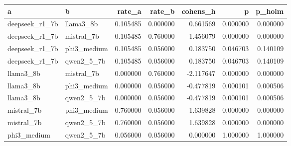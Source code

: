 \begin{tabular}{llrrrrr}
\toprule
a & b & rate\_a & rate\_b & cohens\_h & p & p\_holm \\
\midrule
deepseek\_r1\_7b & llama3\_8b & 0.105485 & 0.000000 & 0.661569 & 0.000000 & 0.000000 \\
deepseek\_r1\_7b & mistral\_7b & 0.105485 & 0.760000 & -1.456079 & 0.000000 & 0.000000 \\
deepseek\_r1\_7b & phi3\_medium & 0.105485 & 0.056000 & 0.183750 & 0.046703 & 0.140109 \\
deepseek\_r1\_7b & qwen2\_5\_7b & 0.105485 & 0.056000 & 0.183750 & 0.046703 & 0.140109 \\
llama3\_8b & mistral\_7b & 0.000000 & 0.760000 & -2.117647 & 0.000000 & 0.000000 \\
llama3\_8b & phi3\_medium & 0.000000 & 0.056000 & -0.477819 & 0.000101 & 0.000506 \\
llama3\_8b & qwen2\_5\_7b & 0.000000 & 0.056000 & -0.477819 & 0.000101 & 0.000506 \\
mistral\_7b & phi3\_medium & 0.760000 & 0.056000 & 1.639828 & 0.000000 & 0.000000 \\
mistral\_7b & qwen2\_5\_7b & 0.760000 & 0.056000 & 1.639828 & 0.000000 & 0.000000 \\
phi3\_medium & qwen2\_5\_7b & 0.056000 & 0.056000 & 0.000000 & 1.000000 & 1.000000 \\
\bottomrule
\end{tabular}

